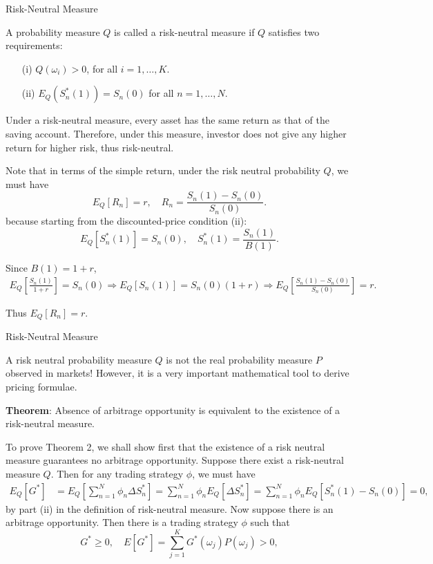 \documentclass{beamer}
\begin{document}
\begin{frame}{Risk-Neutral Measure}

    {\footnotesize \footnotesize
        A probability measure $Q$ is called a risk-neutral measure if $Q$ satisfies two requirements:
\begin{enumerate}
\item[(i)] $Q(\omega_i) > 0$, for all $i = 1, \ldots, K$.
\item[(ii)] $E_Q(S_n^*(1)) = S_n(0)$ for all $n = 1, \ldots, N$.
\end{enumerate}

Under a risk-neutral measure, every asset has the same return as that 
of the saving account. Therefore, under this measure, 
investor does not give any higher return for higher risk, thus risk-neutral.
\vspace{1em}
\par Note that in terms of the simple return, under the risk neutral probability $Q$, we must have
\[
E_Q[R_n] = r, \quad R_n = \frac{S_n(1) - S_n(0)}{S_n(0)}.
\]
because starting from the discounted-price condition (ii):  
\[
E_Q[S_n^*(1)] = S_n(0), \quad S_n^*(1) = \frac{S_n(1)}{B(1)}.
\]

Since $B(1) = 1 + r$,  
\begin{align*}
E_Q\left[\frac{S_n(1)}{1 + r}\right] = S_n(0) 
\Rightarrow E_Q[S_n(1)] = S_n(0)(1 + r) 
\Rightarrow E_Q\left[\frac{S_n(1) - S_n(0)}{S_n(0)}\right] = r.
\end{align*}

Thus $E_Q[R_n] = r$.

    }
\end{frame}

\begin{frame}{Risk-Neutral Measure}

    {\footnotesize \footnotesize
    \par A risk neutral probability measure $Q$ is not the real probability 
    measure $P$ observed in markets! 
    However, it is a very important mathematical tool to derive pricing formulae. 
    \vspace{1em}
    \par \textbf{Theorem}: Absence of arbitrage opportunity is equivalent 
    to the existence of a risk-neutral measure.
    \par To prove Theorem 2, we shall show first that the existence of a risk neutral measure guarantees no arbitrage opportunity. Suppose there exist a risk-neutral measure $Q$. Then for any trading strategy $\phi$, we must have
\begin{align*}
E_Q[G^*] &= E_Q\left[\sum_{n=1}^N \phi_n \Delta S_n^*\right] = \sum_{n=1}^N \phi_n E_Q[\Delta S_n^*] 
= \sum_{n=1}^N \phi_n E_Q[S_n^*(1) - S_n(0)] = 0,
\end{align*}
by part (ii) in the definition of risk-neutral measure. Now suppose there is an arbitrage opportunity. Then there is a trading strategy $\phi$ such that
\[
G^* \geq 0, \quad E[G^*] = \sum_{j=1}^K G^*(\omega_j) P(\omega_j) > 0,
\]
    }
\end{frame}
\end{document}
